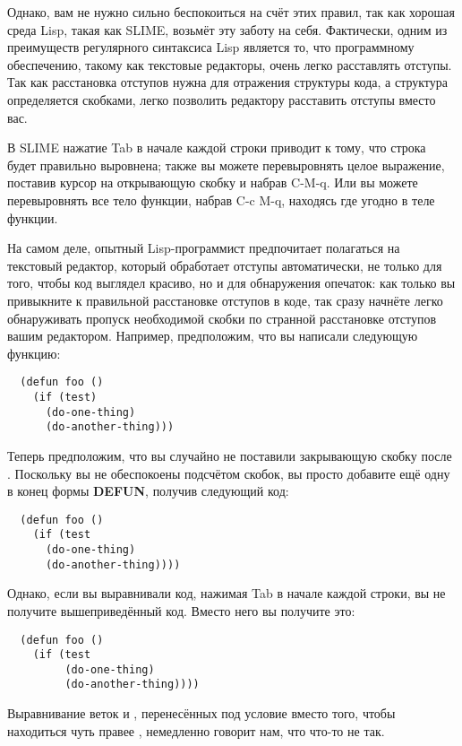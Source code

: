 Однако, вам не нужно сильно беспокоиться на счёт этих правил, так как хорошая среда Lisp,
такая как SLIME, возьмёт эту заботу на себя. Фактически, одним из преимуществ регулярного
синтаксиса Lisp является то, что программному обеспечению, такому как текстовые редакторы,
очень легко расставлять отступы. Так как расстановка отступов нужна для отражения
структуры кода, а структура определяется скобками, легко позволить редактору расставить
отступы вместо вас.

В SLIME нажатие Tab в начале каждой строки приводит к тому, что строка будет правильно
выровнена; также вы можете перевыровнять целое выражение, поставив курсор на открывающую
скобку и набрав C-M-q. Или вы можете перевыровнять все тело функции, набрав C-c M-q,
находясь где угодно в теле функции.

На самом деле, опытный Lisp-программист предпочитает полагаться на текстовый редактор,
который обработает отступы автоматически, не только для того, чтобы код выглядел красиво,
но и для обнаружения опечаток: как только вы привыкните к правильной расстановке отступов
в коде, так сразу начнёте легко обнаруживать пропуск необходимой скобки по странной
расстановке отступов вашим редактором. Например, предположим, что вы написали следующую
функцию:

\begin{lstlisting}
  (defun foo ()
    (if (test)
      (do-one-thing)
      (do-another-thing)))
\end{lstlisting}

Теперь предположим, что вы случайно не поставили закрывающую скобку после
. Поскольку вы не обеспокоены подсчётом скобок, вы просто добавите ещё одну в
конец формы \textbf{DEFUN}, получив следующий код:

\begin{lstlisting}
  (defun foo ()
    (if (test
      (do-one-thing)
      (do-another-thing))))
\end{lstlisting}

Однако, если вы выравнивали код, нажимая Tab в начале каждой строки, вы не получите
вышеприведённый код. Вместо него вы получите это:

\begin{lstlisting}
  (defun foo ()
    (if (test
         (do-one-thing)
         (do-another-thing))))
\end{lstlisting}

Выравнивание веток  и , перенесённых под условие вместо того, чтобы
находиться чуть правее , немедленно говорит нам, что что-то не так.

